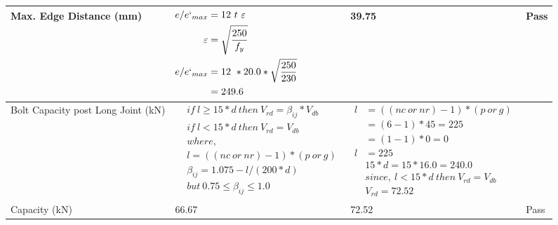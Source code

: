 \documentclass{article}%
\begin{document}
\begin{longtable}{|p{2.5cm}|p{5.5cm}|p{7cm}|p{1cm}|}
\hline%
Max. Edge Distance (mm)&$\begin{aligned}e/e`_{max} &= 12~ t~ \varepsilon&\\ \varepsilon &= \sqrt{\frac{250}{f_y}}\\ e/e`_{max}&=12 ~*20.0*\sqrt{\frac{250}{230}}\\ &=249.6\\ \end{aligned}$&39.75&Pass\\%
\hline%
Bolt Capacity post Long Joint (kN)&$\begin{aligned} &if~l\geq 15 * d~then~V_{rd} = \beta_{ij} * V_{db} \\ & if~l < 15 * d~then~V_{rd} = V_{db} \\ & where,\\ & l = ((nc~or~nr) - 1) * (p~or~g) \\ & \beta_{ij} = 1.075 - l/(200 * d) \\ & but~0.75\leq\beta_{ij}\leq1.0 \end{aligned}$&$\begin{aligned} l&= ((nc~or~nr) - 1) * (p~or~g) \\  &= (6 - 1) * 45=225\\  &= (1 - 1) * 0=0\\  l&= 225\\ & 15 * d = 15 * 16.0 = 240.0 \\ & since,~l < 15 * d~then~V_{rd} = V_{db} \\ & V_{rd} = 72.52 \end{aligned}$&\\%
\hline%
Capacity (kN)&66.67&72.52&Pass\\%
\hline%
\end{longtable}

%
\newpage%
\end{document}
